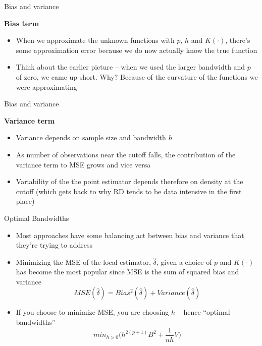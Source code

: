 \documentclass{beamer}
\begin{document}
\begin{frame}{Bias and variance}

\textbf{Bias term}
	\begin{itemize}
	\item When we approximate the unknown functions with $p$, $h$ and $K(\cdot)$, there's some approximation error because we do now actually know the true function
	\item Think about the earlier picture -- when we used the larger bandwidth and $p$ of zero, we came up short. Why? Because of the curvature of the functions we were approximating
	\end{itemize}

\end{frame}



\begin{frame}{Bias and variance}

 \textbf{Variance term}
	\begin{itemize}
	\item Variance depends on sample size and bandwidth $h$
	\item As number of observations near the cutoff falls, the contribution of the variance term to MSE grows and vice versa
	\item Variability of the the point estimator depends therefore on density at the cutoff (which gets back to why RD tends to be data intensive in the first place)
	\end{itemize}

\end{frame}


\begin{frame}{Optimal Bandwidths}

\begin{itemize}
\item Most approaches have some balancing act between bias and variance that they're trying to address
\item Minimizing the MSE of the local estimator, $\widehat{\delta}$, given a choice of $p$ and $K(\cdot)$ has become the most popular since MSE is the sum of squared bias and variance $$MSE(\widehat{\delta}) = Bias^2(\widehat{\delta}) + Variance(\widehat{\delta})$$
\item If you choose to minimize MSE, you are choosing $h$ -- hence ``optimal bandwidths'' $$min_{h>0} \bigg (h^{2(p+1)}B^2+\frac{1}{nh}V \bigg )$$
\end{itemize}

\end{frame}
\end{document}
